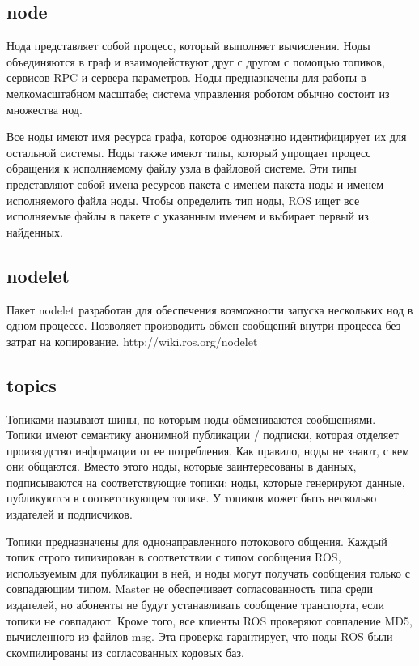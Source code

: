 \subsection{node}
Нода представляет собой процесс, который выполняет вычисления. Ноды объединяются в граф и взаимодействуют друг с другом с помощью топиков, сервисов RPC и сервера параметров. Ноды предназначены для работы в мелкомасштабном масштабе; система управления роботом обычно состоит из множества нод.

Все ноды имеют имя ресурса графа, которое однозначно идентифицирует их для остальной системы. Ноды также имеют типы, который упрощает процесс обращения к исполняемому файлу узла в файловой системе. Эти типы представляют собой имена ресурсов пакета с именем пакета ноды и именем исполняемого файла ноды. Чтобы определить тип ноды, ROS ищет все исполняемые файлы в пакете с указанным именем и выбирает первый из найденных. 
\subsection{nodelet}
Пакет nodelet разработан для обеспечения возможности запуска нескольких нод в одном процессе. Позволяет производить обмен сообщений внутри процесса без затрат на копирование.
http://wiki.ros.org/nodelet
\subsection{topics}
Топиками называют шины, по которым ноды обмениваются сообщениями. Топики имеют семантику анонимной публикации / подписки, которая отделяет производство информации от ее потребления. Как правило, ноды не знают, с кем они общаются. Вместо этого ноды, которые заинтересованы в данных, подписываются на соответствующие топики; ноды, которые генерируют данные, публикуются в соответствующем топике. У топиков может быть несколько издателей и подписчиков.

Топики предназначены для однонаправленного потокового общения. 
Каждый топик строго типизирован в соответствии с типом сообщения ROS, используемым для публикации в ней, и ноды могут получать сообщения только с совпадающим типом. Master не обеспечивает согласованность типа среди издателей, но абоненты не будут устанавливать сообщение транспорта, если топики не совпадают. Кроме того, все клиенты ROS проверяют совпадение MD5, вычисленного из файлов msg. Эта проверка гарантирует, что ноды ROS были скомпилированы из согласованных кодовых баз.


